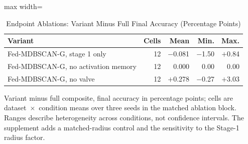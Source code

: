 \begin{table}[!t]
\centering\footnotesize
\setlength{\tabcolsep}{4pt}
\caption{Endpoint Ablations: Variant Minus Full Final Accuracy (Percentage Points)}\label{tab:ablation}
\begin{adjustbox}{max width=\columnwidth}
\begin{tabular}{lrrrr}
\toprule
Variant & Cells & Mean & Min. & Max. \\
\midrule
Fed-MDBSCAN-G, stage 1 only & 12 & $-$0.081 & $-$1.50 & $+$0.84 \\
Fed-MDBSCAN-G, no activation memory & 12 & 0.000 & 0.00 & 0.00 \\
Fed-MDBSCAN-G, no valve & 12 & $+$0.278 & $-$0.27 & $+$3.03 \\
\bottomrule
\end{tabular}
\end{adjustbox}

\par\vspace{3pt}\parbox{\linewidth}{\footnotesize Variant minus full composite, final accuracy in percentage points; cells are dataset~$\times$~condition means over three seeds in the matched ablation block. Ranges describe heterogeneity across conditions, not confidence intervals. The supplement adds a matched-radius control and the sensitivity to the Stage-1 radius factor.}
\end{table}
